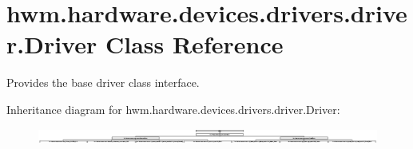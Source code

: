 \hypertarget{classhwm_1_1hardware_1_1devices_1_1drivers_1_1driver_1_1_driver}{\section{hwm.\-hardware.\-devices.\-drivers.\-driver.\-Driver Class Reference}
\label{classhwm_1_1hardware_1_1devices_1_1drivers_1_1driver_1_1_driver}
}


Provides the base driver class interface.  


Inheritance diagram for hwm.\-hardware.\-devices.\-drivers.\-driver.\-Driver\-:\begin{figure}[H]
\begin{center}
\leavevmode
\includegraphics[height=0.522023cm]{classhwm_1_1hardware_1_1devices_1_1drivers_1_1driver_1_1_driver}
\end{center}
\end{figure}
